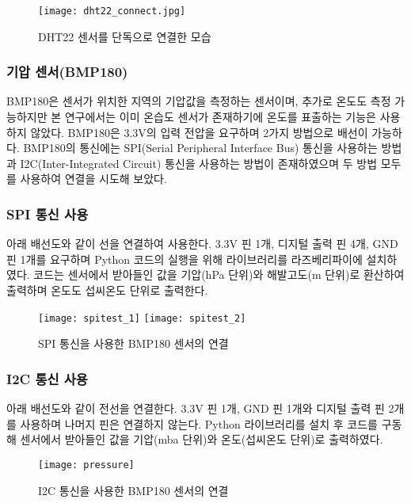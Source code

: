 \begin{figure}[htbp]
	\centering
	\texttt{[image: dht22\_connect.jpg]}
	\caption{DHT22 센서를 단독으로 연결한 모습}
	\label{DHT22}
\end{figure}

\subsubsection{기압 센서(BMP180)}
BMP180은 센서가 위치한 지역의 기압값을 측정하는 센서이며, 추가로 온도도 측정 가능하지만 본 연구에서는 이미 온습도 센서가 존재하기에 온도를 표출하는 기능은 사용하지 않았다. BMP180은 3.3V의 입력 전압을 요구하며 2가지 방법으로 배선이 가능하다. BMP180의 통신에는 SPI(Serial Peripheral Interface Bus) 통신을 사용하는 방법과 I2C(Inter-Integrated Circuit) 통신을 사용하는 방법이 존재하였으며 두 방법 모두를 사용하여 연결을 시도해 보았다.
\subsubsection*{SPI 통신 사용}
아래 배선도와 같이 선을 연결하여 사용한다. 3.3V 핀 1개, 디지털 출력 핀 4개, GND 핀 1개를 요구하며 Python 코드의 실행을 위해 라이브러리를 라즈베리파이에 설치하였다. 코드는 센서에서 받아들인 값을 기압(hPa 단위)와 해발고도(m 단위)로 환산하여 출력하며 온도도 섭씨온도 단위로 출력한다.

\begin{figure}[htbp]
	\centering
	\texttt{[image: spitest\_1]}
	\texttt{[image: spitest\_2]}
	\caption{SPI 통신을 사용한 BMP180 센서의 연결}
	\label{SPI}
\end{figure}

\subsubsection*{I2C 통신 사용}
아래 배선도와 같이 전선을 연결한다. 3.3V 핀 1개, GND 핀 1개와 디지털 출력 핀 2개를 사용하며 나머지 핀은 연결하지 않는다. Python 라이브러리를 설치 후 코드를 구동해 센서에서 받아들인 값을 기압(mba 단위)와 온도(섭씨온도 단위)로 출력하였다.

\begin{figure}[htbp]
	\centering
	\texttt{[image: pressure]}
	\caption{I2C 통신을 사용한 BMP180 센서의 연결}
	\label{I2C}
\end{figure}

